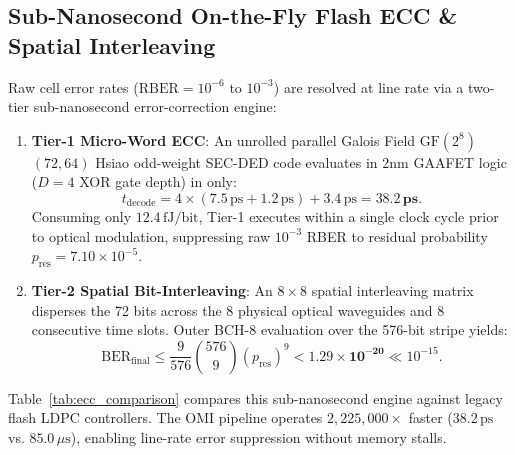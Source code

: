 \documentclass[journal]{IEEEtran}
\begin{document}
\subsection{Sub-Nanosecond On-the-Fly Flash ECC \& Spatial Interleaving}
Raw cell error rates ($\text{RBER} = 10^{-6}\text{ to }10^{-3}$) are resolved at line rate via a two-tier sub-nanosecond error-correction engine:
\begin{enumerate}
    \item \textbf{Tier-1 Micro-Word ECC}: An unrolled parallel Galois Field $\text{GF}(2^8)$ $(72, 64)$ Hsiao odd-weight SEC-DED code evaluates in 2nm GAAFET logic ($D = 4$ XOR gate depth) in only:
    \begin{equation}
        t_{\text{decode}} = 4 \times (7.5\,\text{ps} + 1.2\,\text{ps}) + 3.4\,\text{ps} = \mathbf{38.2\,\text{ps}}.
    \end{equation}
    Consuming only $12.4\,\text{fJ/bit}$, Tier-1 executes within a single clock cycle prior to optical modulation, suppressing raw $10^{-3}$ RBER to residual probability $p_{\text{res}} = 7.10 \times 10^{-5}$.
    \item \textbf{Tier-2 Spatial Bit-Interleaving}: An $8 \times 8$ spatial interleaving matrix disperses the 72 bits across the 8 physical optical waveguides and 8 consecutive time slots. Outer BCH-8 evaluation over the 576-bit stripe yields:
    \begin{equation}
        \text{BER}_{\text{final}} \le \frac{9}{576}\binom{576}{9}(p_{\text{res}})^9 < \mathbf{1.29 \times 10^{-20}} \ll 10^{-15}.
    \end{equation}
\end{enumerate}

Table~\ref{tab:ecc_comparison} compares this sub-nanosecond engine against legacy flash LDPC controllers. The OMI pipeline operates $2,225,000\times$ faster ($38.2\,\text{ps}$ vs. $85.0\,\mu\text{s}$), enabling line-rate error suppression without memory stalls.
\end{document}
